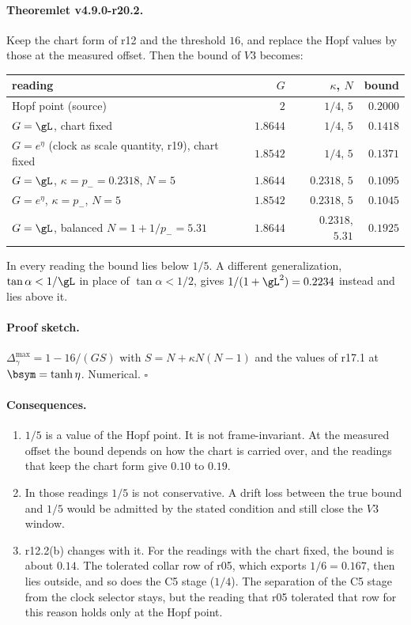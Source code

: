 \paragraph{Theoremlet v4.9.0-r20.2.}
Keep the chart form of r12 and the threshold \(16\), and replace the Hopf values by those at the measured offset.  Then the bound
of \(V3\) becomes:
\begin{center}
\small
\begin{tabular}{@{}>{\raggedright\arraybackslash}p{}rrr@{}}
\toprule
reading & \(G\) & \(\kappa\), \(N\) & bound\\
\midrule
Hopf point (source) & \(2\) & \(1/4\), \(5\) & \(0.2000\)\\
\(G=\gL\), chart fixed & \(1.8644\) & \(1/4\), \(5\) & \(0.1418\)\\
\(G=e^\eta\) (clock as scale quantity, r19), chart fixed & \(1.8542\) & \(1/4\), \(5\) & \(0.1371\)\\
\(G=\gL\), \(\kappa=p_-=0.2318\), \(N=5\) & \(1.8644\) & \(0.2318\), \(5\) & \(0.1095\)\\
\(G=e^\eta\), \(\kappa=p_-\), \(N=5\) & \(1.8542\) & \(0.2318\), \(5\) & \(0.1045\)\\
\(G=\gL\), balanced \(N=1+1/p_-=5.31\) & \(1.8644\) & \(0.2318\), \(5.31\) & \(0.1925\)\\
\bottomrule
\end{tabular}
\end{center}
In every reading the bound lies below \(1/5\).  A different generalization, \(\tan\alpha<1/\gL\) in place of \(\tan\alpha<1/2\),
gives \(1/(1+\gL^2)=0.2234\) instead and lies above it.

\paragraph{Proof sketch.}
\(\Delta_\gamma^{\max}=1-16/(GS)\) with \(S=N+\kappa N(N-1)\) and the values of r17.1 at \(\bsym=\tanh\eta\).  Numerical.  \(\square\)

\paragraph{Consequences.}
\begin{enumerate}[leftmargin=2em]
\item \(1/5\) is a value of the Hopf point.  It is not frame-invariant.  At the measured offset the bound depends on how the
chart is carried over, and the readings that keep the chart form give \(0.10\) to \(0.19\).
\item In those readings \(1/5\) is not conservative.  A drift loss between the true bound and \(1/5\) would be admitted by the
stated condition and still close the \(V3\) window.
\item r12.2(b) changes with it.  For the readings with the chart fixed, the bound is about \(0.14\).  The tolerated collar row
of r05, which exports \(1/6=0.167\), then lies outside, and so does the C5 stage (\(1/4\)).  The separation of the C5 stage from
the clock selector stays, but the reading that r05 tolerated that row for this reason holds only at the Hopf point.
\end{enumerate}

